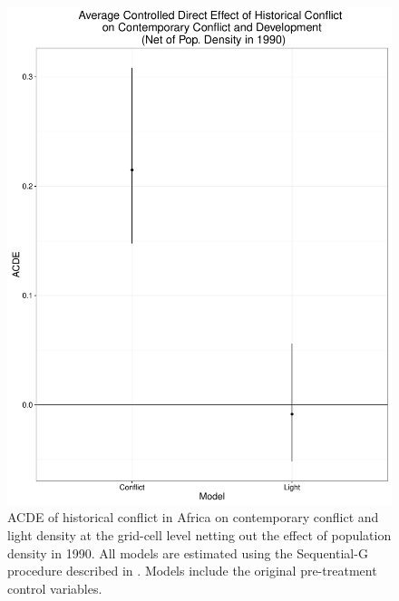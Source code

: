 \begin{figure}
\begin{center}
\includegraphics[scale=0.5]{Figures/acde_grid}
\caption{ACDE of historical conflict in Africa on contemporary conflict and light density at the grid-cell level netting out the effect of population density in 1990. All models are estimated using the Sequential-G procedure described in \citet{AcharyaBlackwellSen2016}. Models include the original pre-treatment control variables.}
\label{fig:acdegrid}
\end{center}
\end{figure}

